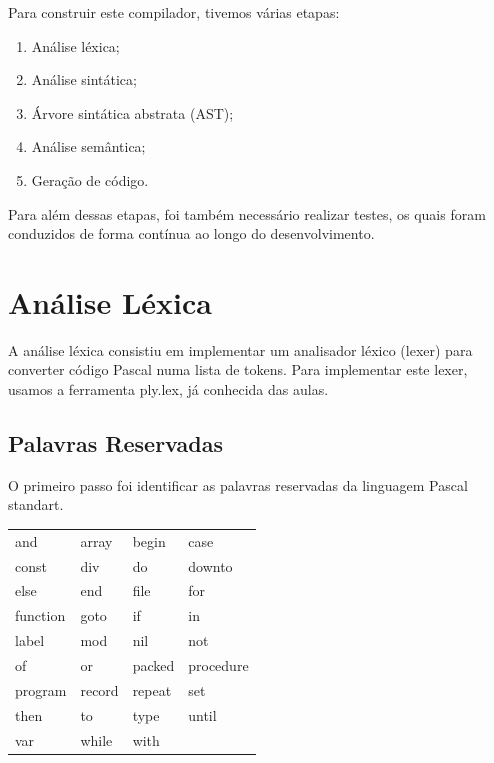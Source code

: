 \documentclass[12pt,a4paper]{report}
\begin{document}
\vspace{1em}

Para construir este compilador, tivemos várias etapas:
\begin{enumerate}
    \item Análise léxica;
    \item Análise sintática;
    \item Árvore sintática abstrata (AST);
    \item Análise semântica;
    \item Geração de código.
\end{enumerate}

Para além dessas etapas, foi também necessário realizar testes, os quais foram conduzidos de forma contínua ao longo do desenvolvimento.

\chapter{Análise Léxica}

A análise léxica consistiu em implementar um analisador léxico (lexer) para converter código Pascal numa lista de tokens. Para implementar este lexer,
usamos a ferramenta ply.lex, já conhecida das aulas.

\section{Palavras Reservadas}

O primeiro passo foi identificar as palavras reservadas da linguagem Pascal standart.

\begin{center}
\begin{tabular}{>{\ttfamily} l >{\ttfamily} l >{\ttfamily} l >{\ttfamily} l}
\toprule
and & array & begin & case \\
const & div & do & downto \\
else & end & file & for \\
function & goto & if & in \\
label & mod & nil & not \\
of & or & packed & procedure \\
program & record & repeat & set \\
then & to & type & until \\
var & while & with & \\
\bottomrule
\end{tabular}
\end{center}
\end{document}

